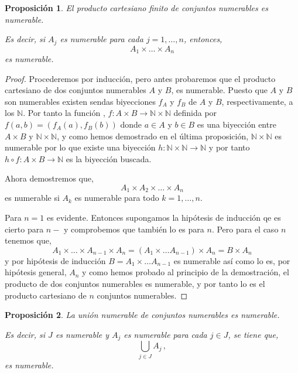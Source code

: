 \documentclass[12pt]{book}
\newtheorem{prop}{\bf Proposición}[chapter]
\def\NN{\mathbb{N}}
\begin{document}
\begin{prop} El producto cartesiano  finito de conjuntos numerables es numerable.

Es decir, si $A_j$ es numerable para cada $j=1,\dots,n$, entonces,
$$A_1\times\dots \times  A_n$$
es numerable.
\end{prop}
\begin{proof}
 Procederemos por inducción, pero antes probaremos que el producto cartesiano de dos conjuntos 
numerables $A$ y $B$, es numerable. Puesto que $A$ y $B$ son numerables existen  sendas 
biyecciones $f_A$ y $f_B$ de $A$ y $B$, respectivamente, a los $\NN$. Por tanto la función , 
$f:A\times B\longrightarrow \NN\times\NN$ definida por $f(a,b)=(f_A(a),f_B(b))$ donde $a\in A$ y 
$b\in B$ es una biyección entre  $A\times B$ y $\NN\times\NN$, y como hemos demostrado en el 
última proposición, $\NN\times\NN$ es numerable por lo que existe una biyección $h:
\NN\times\NN\longrightarrow \NN$ y por tanto $h\circ f:A\times B\longrightarrow \NN$ es la 
biyección buscada.
 

Ahora demostremos que,
$$A_1\times A_2\times \dots\times A_n$$
es numerable  si $A_k$ es numerable para todo $k=1,\dots,n$.

Para $n=1$ es evidente. Entonces supongamos la hipótesis de inducción qe es cierto para $n-$  y 
comprobemos que también lo es para $n$. Pero para el caso $n$ tenemos que,
$$A_1\times\dots\times  A_{n-1}\times A_n = (A_1\times \dots A_{n-1})\times A_n=B\times A_n$$
y por hipótesis de inducción $B=A_1\times \dots A_{n-1}$ es numerable  así como lo es, por 
hipótesis general, $A_n$ y como hemos probado al principio de la demostración, el producto de 
dos conjuntos numerables es numerable, y por tanto lo es el producto cartesiano de $n$ conjuntos 
numerables.
\end{proof}
\begin{prop}  La unión numerable de conjuntos numerables es numerable.

Es decir, si $J$ es numerable y $A_j$ es numerable para cada $j\in J$, se tiene que, 
$$\bigcup_{j\in J} A_j\,,$$
es numerable.
\end{prop}   
\end{document}
